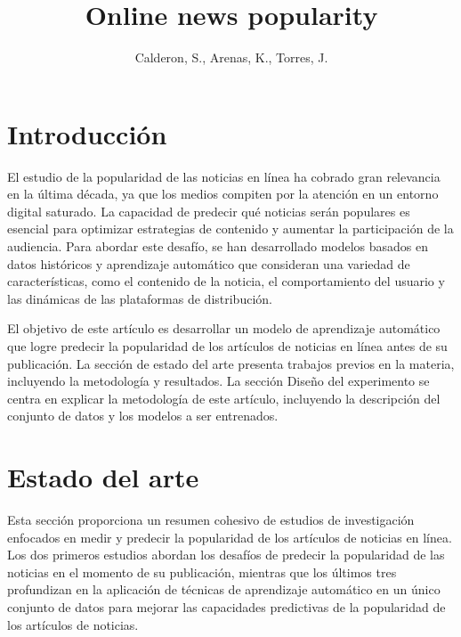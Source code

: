 \documentclass[
  number,
  preprint,
  3p,
  twocolumn]{elsarticle}
\begin{document}
\begin{frontmatter}
\title{Online news popularity}
\author[]{Calderon, S., Arenas, K., Torres, J.%
%
}




        





\end{frontmatter}
    
\section{Introducción}\label{introducciuxf3n}

El estudio de la popularidad de las noticias en línea ha cobrado gran
relevancia en la última década, ya que los medios compiten por la
atención en un entorno digital saturado. La capacidad de predecir qué
noticias serán populares es esencial para optimizar estrategias de
contenido y aumentar la participación de la audiencia. Para abordar este
desafío, se han desarrollado modelos basados en datos históricos y
aprendizaje automático que consideran una variedad de características,
como el contenido de la noticia, el comportamiento del usuario y las
dinámicas de las plataformas de distribución.

El objetivo de este artículo es desarrollar un modelo de aprendizaje
automático que logre predecir la popularidad de los artículos de
noticias en línea antes de su publicación. La sección de estado del arte
presenta trabajos previos en la materia, incluyendo la metodología y
resultados. La sección Diseño del experimento se centra en explicar la
metodología de este artículo, incluyendo la descripción del conjunto de
datos y los modelos a ser entrenados.

\section{Estado del arte}\label{estado-del-arte}

Esta sección proporciona un resumen cohesivo de estudios de
investigación enfocados en medir y predecir la popularidad de los
artículos de noticias en línea. Los dos primeros estudios abordan los
desafíos de predecir la popularidad de las noticias en el momento de su
publicación, mientras que los últimos tres profundizan en la aplicación
de técnicas de aprendizaje automático en un único conjunto de datos para
mejorar las capacidades predictivas de la popularidad de los artículos
de noticias.
\end{document}
